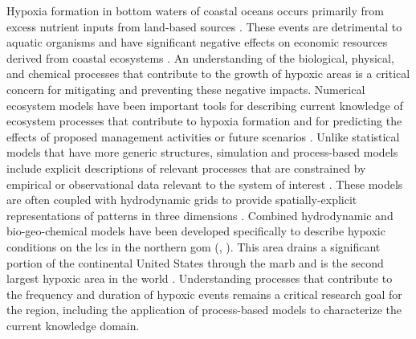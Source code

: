 \documentclass[letterpaper,12pt,oneside]{article}\usepackage[]{graphicx}\usepackage[]{color}
\begin{document}
Hypoxia formation in bottom waters of coastal oceans occurs primarily from excess nutrient inputs from land-based sources \citep{Justic87,Diaz95,Howarth96}.  These events are detrimental to aquatic organisms and have significant negative effects on economic resources derived from coastal ecosystems \citep{Lipton03,Diaz11}.  An understanding of the biological, physical, and chemical processes that contribute to the growth of hypoxic areas is a critical concern for mitigating and preventing these negative impacts.  Numerical ecosystem models have been important tools for describing current knowledge of ecosystem processes that contribute to hypoxia formation and for predicting the effects of proposed management activities or future scenarios \citep{Scavia04,Hagy07,Pauer16}.  Unlike statistical models that have more generic structures, simulation and process-based models include explicit descriptions of relevant processes that are constrained by empirical or observational data relevant to the system of interest \citep[e.g.][]{Omlin01b,Eldridge10}.  These models are often coupled with hydrodynamic grids to provide spatially-explicit representations of patterns in three dimensions \citep{Warner05,Zhao10,Ganju16}. Combined hydrodynamic and bio-geo-chemical models have been developed specifically to describe hypoxic conditions on the \ac{lcs} in the northern \ac{gom} (\citealt{Obenour15,Pauer16}, ).  This area drains a significant portion of the continental United States through the \ac{marb} and is the second largest hypoxic area in the world \citep{Rabalais02}.  Understanding processes that contribute to the frequency and duration of hypoxic events remains a critical research goal for the region, including the application of process-based models to characterize the current knowledge domain.  
\end{document}

